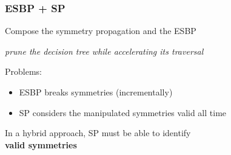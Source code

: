 \documentclass{beamer}
\begin{document}
\begin{frame}
\frametitle{ESBP + SP}


Compose the symmetry propagation and the ESBP\\
\begin{center}
	\textit{prune the decision tree while accelerating its traversal}
\end{center}

\vfill

Problems:
\begin{itemize}
	\item ESBP breaks symmetries (incrementally)
	\item SP considers the manipulated symmetries valid all time
\end{itemize}

\vfill
\centering
In a hybrid approach, SP must be able to identify\\ \textbf{valid symmetries}
\end{frame}
\end{document}
